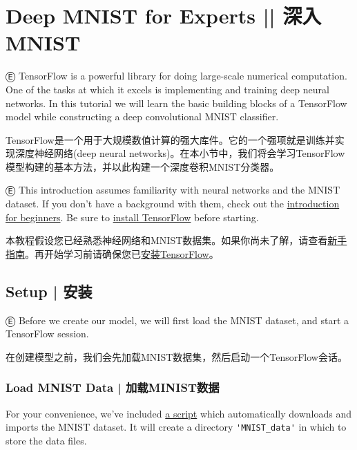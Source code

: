



\newpage
\section {\textcolor{etc}{Deep MNIST for Experts}   ||   深入MNIST} \label{MINIST_pros}

Ⓔ \textcolor{etc}{TensorFlow is a powerful library for doing large-scale numerical computation. One of the tasks at which it excels is implementing and training deep neural networks. In this tutorial we will learn the basic building blocks of a TensorFlow model while constructing a deep convolutional MNIST classifier.}

TensorFlow是一个用于大规模数值计算的强大库件。它的一个强项就是训练并实现深度神经网络(deep neural networks)。在本小节中，我们将会学习TensorFlow模型构建的基本方法，并以此构建一个深度卷积MNIST分类器。

Ⓔ \textcolor{etc}{This introduction assumes familiarity with neural networks and the MNIST dataset. If you don't have a background with them, check out the \hyperref[MINIST_beginner]{introduction for beginners}. Be sure to \hyperref[download_install]{install TensorFlow} before starting.}

本教程假设您已经熟悉神经网络和MNIST数据集。如果你尚未了解，请查看\hyperref[MINIST_beginner]{新手指南}。再开始学习前请确保您已\hyperref[download_install]{安装TensorFlow}。

%
\subsection {Setup  |  安装}

Ⓔ \textcolor{etc}{Before we create our model, we will first load the MNIST dataset, and start a TensorFlow session.}

在创建模型之前，我们会先加载MNIST数据集，然后启动一个TensorFlow会话。

\subsubsection {Load MNIST Data  |  加载MINIST数据}

\textcolor{etc}{For your convenience, we've included \href{https://tensorflow.googlesource.com/tensorflow/+/master/tensorflow/examples/tutorials/mnist/input_data.py}{a script} which automatically downloads and imports the MNIST dataset. It will create a directory \lstinline{'MNIST_data'} in which to store the data files.}

